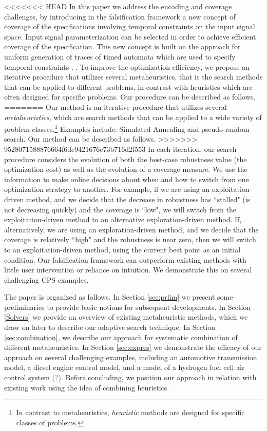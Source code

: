 <<<<<<< HEAD
In this paper we address the encoding and coverage challenges, by introducing in the falsification framework a new concept of
coverage of the specifications involving temporal constraints on the input signal space. Input signal parameterization can be selected in order to achieve
efficient coverage of the specification. This new concept is built on the approach for uniform
generation of traces of timed automata which are used to specify temporal constraints  \cite{}.
. To improve the optimization efficiency, we propose an iterative procedure that utilizes several
metaheuristics, that is the search methods that can be applied to
different problems, in contrast with heuristics which are often
designed for specific problems. Our procedure can be described as follows. 
=======
Our method is an iterative procedure that utilizes several 
\emph{metaheuristics}, which are search methods that can be applied to
a wide variety of problem classes.\footnote{In contrast to metaheuristics, \emph{heuristic} methods are 
designed for specific classes of problems.} Examples include: Simulated Annealing and pseudo-random search. Our method can be described as follows. 
>>>>>>> 9528071588876664f6de9421676c73b716d2f553
In each iteration, our
search procedure considers the evolution of both the best-case
robustness value (the optimization cost) as well as the evolution of a
coverage measure.  We use the information to make online decisions
about when and how to switch from one optimization strategy to
another.  For example, if we are using an exploitation-driven method,
and we decide that the decrease in robustness has ``stalled" (is not
decreasing quickly) and the coverage is ``low", we will switch from
the exploitation-driven method to an alternative exploration-driven
method.  If, alternatively, we are using an exploration-driven method,
and we decide that the coverage is relatively ``high" and the
robustness is near zero, then we will switch to an exploitation-driven
method, using the current best point as an initial condition. 
Our falsification framework can outperform existing methods with little user intervention or reliance on intuition. We demonstrate this on several 
challenging CPS examples.

The paper is organized as follows. In Section \ref{sec:prlim} we present some preliminaries to provide basic notions for subsequent developments. In Section \ref{Solvers} we provide an overview of existing metaheuristic methods, which we draw on later to describe our adaptive search technique.
 In Section \ref{sec:combination}, we describe our approach for systematic combination of different metaheuristics. In Section \ref{sec:expres} we demonstrate the efficacy of our approach on several challenging examples, including an automotive transmission model, a diesel engine control model, and a model of a hydrogen fuel cell air control system \textcolor{red}{(?)}. Before concluding, we position our approach in relation with existing work using the idea of combining heuristics. 

